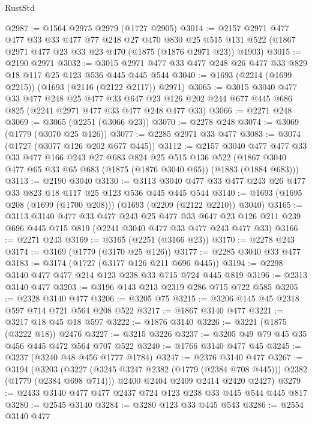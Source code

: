 \begin{lexlean}{RustStd}
\begin{coremodule}
@2987 := @1564 @2975 @2979 (@1727 @2905)
@3014 := @2157
    @2971
    @477
    @477
    @33
    @33
    @477
    @77
    @248
    @27
    @470
    @830
    @25
    @515
    @131
    @522
    (@1867 @2971 @477 @23 @33 @23 @470 (@1875 (@1876 @2971 @23)) @1903)
@3015 := @2190 @2971
@3032 := @3015 @2971 @477 @33 @477 @248 @26 @477 @33 @829 @18 @117 @25 @123 @536 @445 @445 @544
@3040 := @1693 (@2214 (@1699 @2215)) (@1693 (@2116 (@2122 @2117)) @2971)
@3065 := @3015
    @3040
    @477
    @33
    @477
    @248
    @25
    @477
    @33
    @647
    @23
    @126
    @202
    @244
    @677
    @445
    @686
    @825
    (@2241 @2971 @477 @33 @477 @248 @477 @33)
@3066 := @2271 @248
@3069 := @3065 (@2251 (@3066 @23))
@3070 := @2278 @248
@3074 := @3069 (@1779 (@3070 @25 @126))
@3077 := @2285 @2971 @33 @477
@3083 := @3074 (@1727 (@3077 @126 @202 @677 @445))
@3112 := @2157
    @3040
    @477
    @477
    @33
    @33
    @477
    @166
    @243
    @27
    @683
    @824
    @25
    @515
    @136
    @522
    (@1867 @3040 @477 @65 @33 @65 @683 (@1875 (@1876 @3040 @65)) (@1883 (@1884 @683)))
@3113 := @2190 @3040
@3130 := @3113 @3040 @477 @33 @477 @243 @26 @477 @33 @823 @18 @117 @25 @123 @536 @445 @445 @544
@3140 := @1693 (@1695 @208 (@1699 (@1700 @208))) (@1693 (@2209 (@2122 @2210)) @3040)
@3165 := @3113
    @3140
    @477
    @33
    @477
    @243
    @25
    @477
    @33
    @647
    @23
    @126
    @211
    @239
    @696
    @445
    @715
    @819
    (@2241 @3040 @477 @33 @477 @243 @477 @33)
@3166 := @2271 @243
@3169 := @3165 (@2251 (@3166 @23))
@3170 := @2278 @243
@3174 := @3169 (@1779 (@3170 @25 @126))
@3177 := @2285 @3040 @33 @477
@3183 := @3174 (@1727 (@3177 @126 @211 @696 @445))
@3194 := @2298 @3140 @477 @477 @214 @123 @238 @33 @715 @724 @445 @819
@3196 := @2313 @3140 @477
@3203 := @3196 @143 @213 @2319 @286 @715 @722 @585
@3205 := @2328 @3140 @477
@3206 := @3205 @75
@3215 := @3206 @145 @45 @2318 @597 @714 @721 @564 @208 @522
@3217 := @1867 @3140 @477
@3221 := @3217 @18 @45 @18 @597
@3222 := @1876 @3140
@3226 := @3221 (@1875 (@3222 @18)) @2476
@3227 := @3215 @3226
@3237 := @3205 @49 @79 @45 @35 @456 @445 @472 @564 @707 @522
@3240 := @1766 @3140 @477 @45
@3245 := @3237 (@3240 @48 @456 @1777 @1784)
@3247 := @2376 @3140 @477
@3267 := @3194
    (@3203
      (@3227 (@3245 @3247 @2382 (@1779 (@2384 @708 @445))) @2382 (@1779 (@2384 @698 @714)))
      @2400
      @2404
      @2409
      @2414
      @2420
      @2427)
@3279 := @2433 @3140 @477 @477 @2437 @724 @123 @238 @33 @445 @544 @445 @817
@3280 := @2545 @3140
@3284 := @3280 @123 @33 @445 @543
@3286 := @2554 @3140 @477

\end{coremodule}
\end{lexlean}
